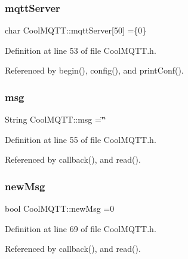 \subsubsection{\texorpdfstring{mqtt\+Server}{mqttServer}}
{\footnotesize\ttfamily char Cool\+M\+Q\+T\+T\+::mqtt\+Server\mbox{[}50\mbox{]} =\{\textquotesingle{}0\textquotesingle{}\}\hspace{0.3cm}{\ttfamily [private]}}



Definition at line 53 of file Cool\+M\+Q\+T\+T.\+h.



Referenced by begin(), config(), and print\+Conf().

\mbox{\label{classCoolMQTT_af6b19e7074dbbb4ae493c44dcb53f7ff}} 
\subsubsection{\texorpdfstring{msg}{msg}}
{\footnotesize\ttfamily String Cool\+M\+Q\+T\+T\+::msg =\char`\"{}\char`\"{}\hspace{0.3cm}{\ttfamily [private]}}



Definition at line 55 of file Cool\+M\+Q\+T\+T.\+h.



Referenced by callback(), and read().

\mbox{\label{classCoolMQTT_a3240388137b885775aadf38e96b24c6b}} 
\subsubsection{\texorpdfstring{new\+Msg}{newMsg}}
{\footnotesize\ttfamily bool Cool\+M\+Q\+T\+T\+::new\+Msg =0\hspace{0.3cm}{\ttfamily [private]}}



Definition at line 69 of file Cool\+M\+Q\+T\+T.\+h.



Referenced by callback(), and read().

\mbox{\label{classCoolMQTT_a109c786a17b463f9eeba046194279522}} 
